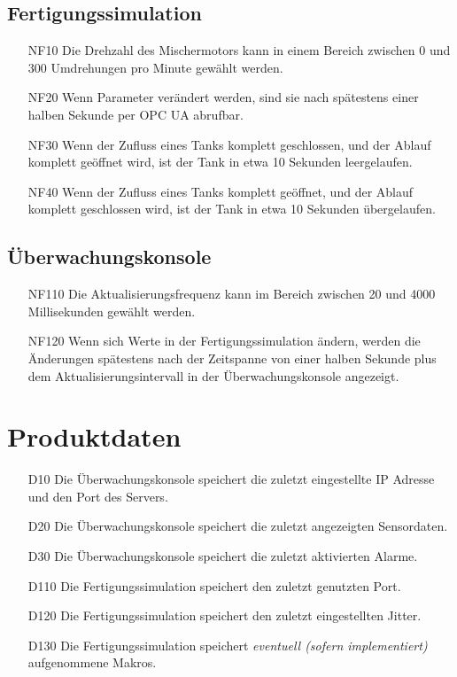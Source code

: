 \documentclass[parskip=full]{scrartcl}
\begin{document}
\subsection{Fertigungssimulation}
\begin{enumerate}
 \item[NF10] Die Drehzahl des Mischermotors kann in einem Bereich zwischen 0 und 300 Umdrehungen pro Minute gewählt werden.
 \item[NF20] Wenn Parameter verändert werden, sind sie nach spätestens einer halben Sekunde per OPC UA abrufbar.
 \item[NF30] Wenn der Zufluss eines Tanks komplett geschlossen, und der Ablauf komplett geöffnet wird, ist der Tank in etwa 10 Sekunden leergelaufen.
 \item[NF40] Wenn der Zufluss eines Tanks komplett geöffnet, und der Ablauf komplett geschlossen wird, ist der Tank in etwa 10 Sekunden übergelaufen.
\end{enumerate}

\subsection{Überwachungskonsole}
\begin{enumerate}
 \item[NF110] Die Aktualisierungsfrequenz kann im Bereich zwischen 20 und 4000 Millisekunden gewählt werden.
 \item[NF120] Wenn sich Werte in der Fertigungssimulation ändern, werden die Änderungen spätestens nach der Zeitspanne von
   einer halben Sekunde plus dem Aktualisierungsintervall in der Überwachungskonsole angezeigt.
\end{enumerate}

\section{Produktdaten}
\begin{enumerate}
 \item[D10] Die Überwachungskonsole speichert die zuletzt eingestellte IP Adresse und den Port des Servers.
 \item[D20] Die Überwachungskonsole speichert die zuletzt angezeigten Sensordaten.
 \item[D30] Die Überwachungskonsole speichert die zuletzt aktivierten Alarme.
 \item[D110] Die Fertigungssimulation speichert den zuletzt genutzten Port.
 \item[D120] Die Fertigungssimulation speichert den zuletzt eingestellten Jitter.
 \item[D130] Die Fertigungssimulation speichert \emph{eventuell (sofern implementiert)} aufgenommene Makros.
\end{enumerate}
\end{document}
